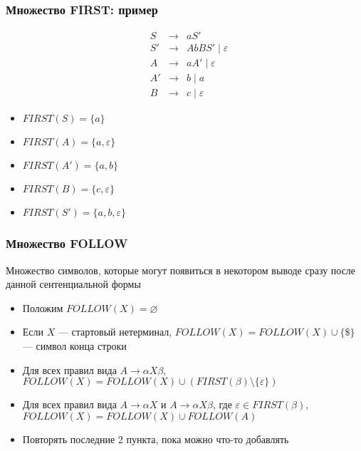 \documentclass{beamer}
\begin{document}
\begin{frame}[fragile]
  \transwipe[direction=90]
  \frametitle{Множество FIRST: пример}
  \[
  \begin{array}{crcl}
  &S  & \to & a S' \\
  
  &S' & \to & A b B S' \mid \varepsilon \\
  
  &A  & \to & a A' \mid \varepsilon \\
  &A' & \to & b \mid a \\
  &B  & \to & c \mid \varepsilon  
  \end{array}
  \] \pause
  
  \begin{itemize}
    \item $FIRST(S) = \{ a \}$ \pause
    \item $FIRST(A) = \{ a, \varepsilon \}$ \pause
    \item $FIRST(A') = \{ a, b \}$ \pause
    \item $FIRST(B) = \{ c, \varepsilon \}$ \pause
    \item $FIRST(S') = \{ a, b, \varepsilon \}$ 
  \end{itemize}
\end{frame}

\begin{frame}[fragile]
  \transwipe[direction=90]
  \frametitle{Множество FOLLOW}
\begin{center}
  Множество символов, которые могут появиться в некотором выводе сразу после данной сентенциальной формы
\end{center}

  \begin{itemize}

   \item Положим $FOLLOW(X) = \varnothing $
   \item Если $X$ --- стартовый нетерминал, $FOLLOW(X) = FOLLOW(X) \cup \{ \$ \}$ --- символ конца строки
   \item Для всех правил вида $A \to \alpha X \beta$, $FOLLOW(X) = FOLLOW(X) \cup (FIRST(\beta) \setminus \{ \varepsilon\})$
   \item Для всех правил вида $A \to \alpha X$ и $A \to \alpha X \beta$, где $\varepsilon \in FIRST(\beta)$, $FOLLOW(X) = FOLLOW(X) \cup FOLLOW(A)$
   \item Повторять последние 2 пункта, пока можно что-то добавлять
  \end{itemize}
\end{frame}
\end{document}
